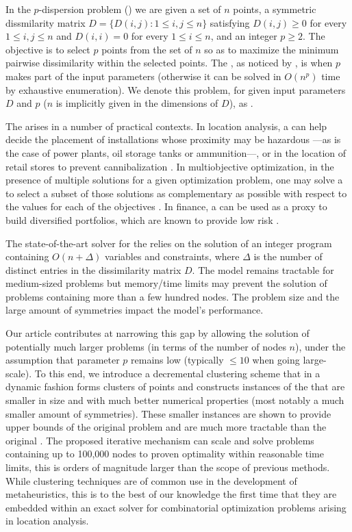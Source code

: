 \documentclass[ijoo,nonblindrev]{informs-ijoo}
\begin{document}
In the $p$-dispersion problem (\pDP{}) we are given a set of $n$ points, a symmetric dissmilarity matrix $D = \{D(i, j): 1\leq i, j\leq n\}$ satisfying $D(i, j) \geq 0$ for every $1\leq i, j\leq n$ and $D(i, i) = 0$ for every $1\leq i\leq n$, and an integer $p\geq 2$. The objective is to select $p$ points from the set of $n$ so as to maximize the minimum pairwise dissimilarity within the selected points. The \pDP{}, as noticed by \citet{Erkut1990discrete}, is \nphard{} when $p$ makes part of the input parameters (otherwise it can be solved in $O(n^p)$ time by exhaustive enumeration). We denote this problem, for given input parameters $D$ and $p$ ($n$ is implicitly given in the dimensions of $D$), as .%

The \pDP{} arises in a number of practical contexts. In location analysis, a \pDP{} can help decide the placement of installations whose proximity may be hazardous ---as is the case of power plants, oil storage tanks or ammunition---, or in the location of retail stores to prevent cannibalization \citep{Kuby1987Programming}. In multiobjective optimization, in the presence of multiple solutions for a given optimization problem, one may solve a \pDP{} to select a subset of those solutions as complementary as possible with respect to the values for each of the objectives \citep{Saboonchi2014MaxMinMin}. In finance, a \pDP{} can be used as a proxy to build diversified portfolios, which are known to provide low risk \citep{Statman1987how}.
	
The state-of-the-art solver for the \pDP{} \citep{Sayah2017new} relies on the solution of an integer program containing $O(n + \Delta)$ variables and constraints, where $\Delta$ is the number of distinct entries in the dissimilarity matrix $D$. The model remains tractable for medium-sized problems but memory/time limits may prevent the solution of problems containing more than a few hundred nodes. The problem size and the large amount of symmetries impact the model's performance. 

Our article contributes at narrowing this gap by allowing the solution of potentially much larger problems (in terms of the number of nodes $n$), under the assumption that parameter $p$ remains low (typically $\leq 10$ when going large-scale). To this end, we introduce a decremental clustering scheme that in a dynamic fashion forms clusters of points and constructs instances of the \pDP{} that are smaller in size and with much better numerical properties (most notably a much smaller amount of symmetries). These smaller instances are shown to provide upper bounds of the original problem and are much more tractable than the original \pDP{}. The proposed iterative mechanism can scale and solve problems containing up to 100,000 nodes to proven optimality within reasonable time limits, this is orders of magnitude larger than the scope of previous methods. While clustering techniques are of common use in the development of metaheuristics, this is to the best of our knowledge the first time that they are embedded within an exact solver for combinatorial optimization problems arising in location analysis.
\end{document}
